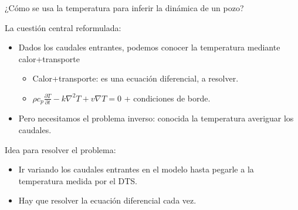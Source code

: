 \documentclass[presentation]{beamer}
\begin{document}
\begin{frame}{¿Cómo se usa la temperatura para inferir la dinámica de un pozo?}
	\begin{block}{La cuestión central reformulada:}
	\begin{itemize}
		\item Dados los caudales entrantes, podemos conocer la temperatura mediante calor+transporte
		\begin{itemize}
			\item Calor+transporte: es una ecuación diferencial, a resolver.
			\item $\rho c_p \frac{\partial T}{\partial t} - k \nabla^2 T + v\nabla T = 0 $ + condiciones de borde.
		\end{itemize}
		\item Pero necesitamos el problema inverso: conocida la temperatura averiguar los caudales.
	\end{itemize}
\end{block}


	\begin{block}{Idea para resolver el problema:}
	\begin{itemize}
		\item Ir variando los caudales entrantes en el modelo hasta pegarle a la temperatura medida por el DTS.
		\item Hay que resolver la ecuación diferencial cada vez.
	\end{itemize}
\end{block}


\end{frame}


\end{document}
